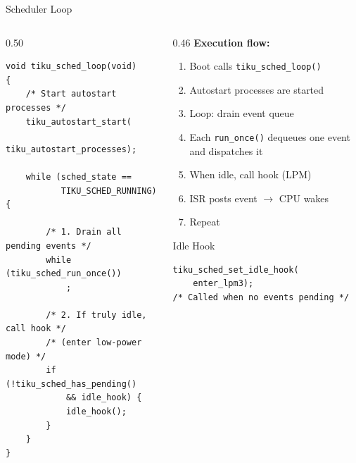 \documentclass[aspectratio=169, 10pt]{beamer}
\begin{document}
\begin{frame}[fragile]{Scheduler Loop}
\begin{columns}[T]
\begin{column}{0.50\textwidth}
\begin{lstlisting}[style=cstyle,
  title={kernel/scheduler/tiku\_sched.c}]
void tiku_sched_loop(void)
{
    /* Start autostart processes */
    tiku_autostart_start(
        tiku_autostart_processes);

    while (sched_state ==
           TIKU_SCHED_RUNNING) {

        /* 1. Drain all pending events */
        while (tiku_sched_run_once())
            ;

        /* 2. If truly idle, call hook */
        /* (enter low-power mode) */
        if (!tiku_sched_has_pending()
            && idle_hook) {
            idle_hook();
        }
    }
}
\end{lstlisting}
\end{column}

\begin{column}{0.46\textwidth}
\textbf{Execution flow:}
\begin{enumerate}
  \item Boot calls \texttt{tiku\_sched\_loop()}
  \item Autostart processes are started
  \item Loop: drain event queue
  \item Each \texttt{run\_once()} dequeues
        one event and dispatches it
  \item When idle, call hook (LPM)
  \item ISR posts event $\rightarrow$ CPU wakes
  \item Repeat
\end{enumerate}

\vspace{0.3em}
\begin{block}{Idle Hook}
\begin{lstlisting}[style=cstyle, basicstyle=\ttfamily\tiny]
tiku_sched_set_idle_hook(
    enter_lpm3);
/* Called when no events pending */
\end{lstlisting}
\end{block}
\end{column}
\end{columns}
\end{frame}
\end{document}
